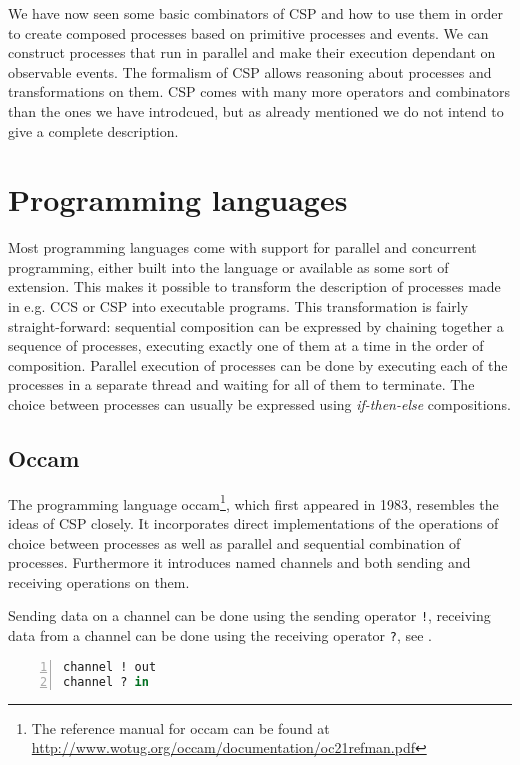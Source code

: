 We have now seen some basic combinators of \textsc{CSP} and how to use them in order to create composed processes based on primitive processes and events. We can construct processes that run in parallel and make their execution dependant on observable events. The formalism of \textsc{CSP} allows reasoning about processes and transformations on them. \textsc{CSP} comes with many more operators and combinators than the ones we have introdcued, but as already mentioned we do not intend to give a complete description.


\section{Programming languages}
Most programming languages come with support for parallel and concurrent programming, either built into the language or available as some sort of extension. This makes it possible to transform the description of processes made in e.g. \textsc{CCS} or \textsc{CSP} into executable programs. This transformation is fairly straight-forward: sequential composition can be expressed by chaining together a sequence of processes, executing exactly one of them at a time in the order of composition. Parallel execution of processes can be done by executing each of the processes in a separate thread and waiting for all of them to terminate. The choice between processes can usually be expressed using \textit{if-then-else} compositions.

\subsection{Occam}
The programming language \textsf{occam}\footnote{The reference manual for \textsf{occam} can be found at \url{http://www.wotug.org/occam/documentation/oc21refman.pdf}}, which first appeared in 1983, resembles the ideas of CSP closely. It incorporates direct implementations of the operations of choice between processes as well as parallel and sequential combination of processes. Furthermore it introduces named channels and both sending and receiving operations on them.

Sending data on a channel can be done using the sending operator \texttt{!}, receiving data from a channel can be done using the receiving operator \texttt{?}, see .

\begin{lstlisting}[language=Caml, caption=Sending data over a channel and receiving data from a channel in \textsf{occam}., label=lst:occam_send_receive, numbers=left, frame=bt]
channel ! out
channel ? in
\end{lstlisting}

